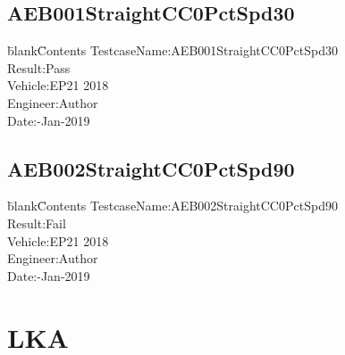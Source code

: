 \documentclass[12pt]{report}
\begin{document}
\section{\label{w3}AEB001StraightCC0PctSpd30} 
\begin{CJK}{GBK}{kai} 
\begin{tabbing} 
\hspace*{40bp}\=blank\hspace*{80bp}\=Contents\kill 
 \>TestcaseName:\>AEB001StraightCC0PctSpd30\\ 
 \>Result:\>Pass\\ 
 \>Vehicle:\>EP21 2018\\ 
 \>Engineer:\>Author\\ 
 \>Date:-Jan-2019\\ 
\end{tabbing} 
\end{CJK} 
\begin{figure}[ht]  
\centering 
\begin{subfigure}{\texttt{[image: AEBfig10001.eps]}} 
\end{subfigure} 
\end{figure} 
\newpage 
\section{\label{w4}AEB002StraightCC0PctSpd90} 
\begin{CJK}{GBK}{kai} 
\begin{tabbing} 
\hspace*{40bp}\=blank\hspace*{80bp}\=Contents\kill 
 \>TestcaseName:\>AEB002StraightCC0PctSpd90\\ 
 \>Result:\>Fail\\ 
 \>Vehicle:\>EP21 2018\\ 
 \>Engineer:\>Author\\ 
 \>Date:-Jan-2019\\ 
\end{tabbing} 
\end{CJK} 
\begin{figure}[ht]  
\centering 
\begin{subfigure}{\texttt{[image: AEBfig10002.eps]}} 
\end{subfigure} 
\end{figure} 
\chapter{LKA} 
\newpage 
\end{document}
